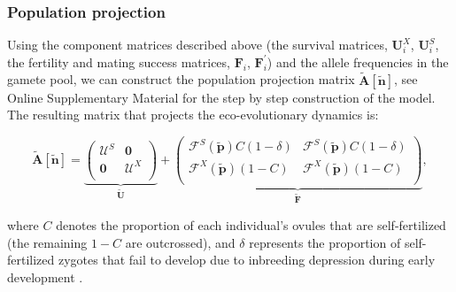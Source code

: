 \documentclass[11pt]{article}
\def\mbf#1{\mathbf{#1}}
\def\mcal#1{\mathcal{#1}}
\begin{document}
\subsubsection*{Population projection}
Using the component matrices described above (the survival matrices, $\mathbf{U}^X_i$, $\mathbf{U}^S_i$, the fertility and mating success matrices, $\mathbf{F}_i$, $\mathbf{F}^\prime_i$) and the allele frequencies in the gamete pool, we can construct the population projection matrix $\tilde{\mbf{A}}[\tilde{\mbf{n}}]$, see Online Supplementary Material for the step by step construction of the model. The resulting matrix that projects the eco-evolutionary dynamics is:
\begin{linenomath*}
\begin{equation} \label{eq:Atilde}
	\tilde{\mbf{A}}[\tilde{\mbf{n}}] = 
			\underbrace{\left(
			\begin{array}{c|c}
				\mcal{U}^S & \mbf{0} \\ \hline
				\mbf{0} & \mcal{U}^X \\
			\end{array} \right)}_{\tilde{\mbf{U}}} + 
			\underbrace{\left(
			\begin{array}{c|c}
				\mcal{F}^S(\tilde{\mbf{p}}) C(1 - \delta) & \mcal{F}^S(\tilde{\mbf{p}}) C(1 - \delta) \\ \hline
				\mcal{F}^X(\tilde{\mbf{p}}) (1 - C) & \mcal{F}^X(\tilde{\mbf{p}}) (1 - C)\\
			\end{array} \right)}_{\tilde{\mbf{F}}},
\end{equation}
\end{linenomath*}
where $C$ denotes the proportion of each individual's ovules that are self-fertilized (the remaining $1 - C$ are outcrossed), and  $\delta$ represents the proportion of self-fertilized zygotes that fail to develop due to inbreeding depression during early development \citep{Charlesworth1987}. 
\end{document}
